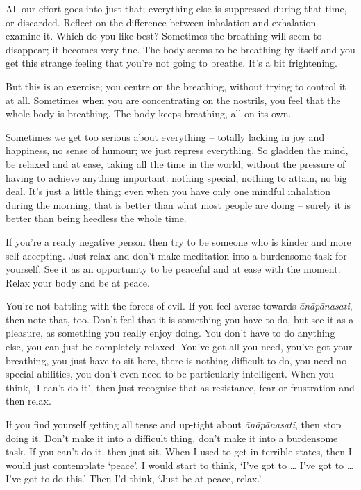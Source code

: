 All our effort goes into just that; everything else is suppressed during that time, or discarded. Reflect on the difference between inhalation and exhalation -- examine it. Which do you like best? Sometimes the breathing will seem to disappear; it becomes very fine. The body seems to be breathing by itself and you get this strange feeling that you're not going to breathe. It's a bit frightening.

But this is an exercise; you centre on the breathing, without trying to control it at all. Sometimes when you are concentrating on the nostrils, you feel that the whole body is breathing. The body keeps breathing, all on its own.

Sometimes we get too serious about everything -- totally lacking in joy and happiness, no sense of humour; we just repress everything. So gladden the mind, be relaxed and at ease, taking all the time in the world, without the pressure of having to achieve anything important: nothing special, nothing to attain, no big deal. It's just a little thing; even when you have only one mindful inhalation during the morning, that is better than what most people are doing -- surely it is better than being heedless the whole time.

If you're a really negative person then try to be someone who is kinder and more self-accepting. Just relax and don't make meditation into a burdensome task for yourself. See it as an opportunity to be peaceful and at ease with the moment. Relax your body and be at peace.

You're not battling with the forces of evil. If you feel averse towards \textit{\=an\=ap\=anasati}, then note that, too. Don't feel that it is something you have to do, but see it as a pleasure, as something you really enjoy doing. You don't have to do anything else, you can just be completely relaxed. You've got all you need, you've got your breathing, you just have to sit here, there is nothing difficult to do, you need no special abilities, you don't even need to be particularly intelligent. When you think, `I can't do it', then just recognise that as resistance, fear or frustration and then relax.

If you find yourself getting all tense and up-tight about \textit{\=an\=ap\=anasati}, then stop doing it. Don't make it into a difficult thing, don't make it into a burdensome task. If you can't do it, then just sit. When I used to get in terrible states, then I would just contemplate `peace'. I would start to think, `I've got to \ldots{} I've got to \ldots{} I've got to do this.' Then I'd think, `Just be at peace, relax.'

